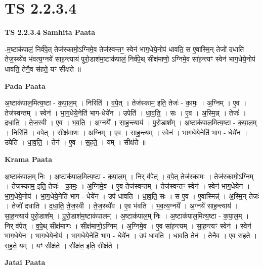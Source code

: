 \documentclass[17pt]{extarticle}
\begin{document}
\section*{ TS 2.2.3.4 }

\textbf{TS 2.2.3.4 } \newline
\textbf{Samhita Paata} \newline

-म॒ष्टाक॑पालं॒ निर्व॑पे॒त् तेज॑स्कामो॒ऽग्निमे॒व तेज॑स्वन्तꣳ॒॒ स्वेन॑ भाग॒धेये॒नोप॑ धावति॒ स ए॒वास्मि॒न् तेजो॑ दधाति तेज॒स्व्ये॑व भ॑वत्य॒ग्नये॑ साह॒न्त्याय॑ पुरो॒डाश॑म॒ष्टाक॑पालं॒ निर्व॑पे॒थ् सीक्ष॑माणो॒ ऽग्निमे॒व सा॑ह॒न्त्यꣳ स्वेन॑ भाग॒धेये॒नोप॑ धावति॒ तेनै॒व स॑हते॒ यꣳ सीक्ष॑ते ॥ \newline

\textbf{Pada Paata} \newline

अ॒ष्टाक॑पाल॒मित्य॒ष्टा - क॒पा॒ल॒म् । निरिति॑ । व॒पे॒त् । तेज॑स्काम॒ इति॒ तेजः॑ - का॒मः॒ । अ॒ग्निम् । ए॒व । तेज॑स्वन्तम् । स्वेन॑ । भा॒ग॒धेये॒नेति॑ भाग-धेये॑न । उपेति॑ । धा॒व॒ति॒ । सः । ए॒व । अ॒स्मि॒न्न् । तेजः॑ । द॒धा॒ति॒ । ते॒ज॒स्वी । ए॒व । भ॒व॒ति॒ । अ॒ग्नये᳚ । सा॒ह॒न्त्याय॑ । पु॒रो॒डाश᳚म् । अ॒ष्टाक॑पाल॒मित्य॒ष्टा - क॒पा॒ल॒म् । निरिति॑ । व॒पे॒त् । सीक्ष॑माणः । अ॒ग्निम् । ए॒व । सा॒ह॒न्त्यम् । स्वेन॑ । भा॒ग॒धेये॒नेति॑ भाग - धेये॑न । उपेति॑ । धा॒व॒ति॒ । तेन॑ । ए॒व । स॒ह॒ते॒ । यम् । सीक्ष॑ते ॥  \newline


\textbf{Krama Paata} \newline

अ॒ष्टाक॑पाल॒म् निः । अ॒ष्टाक॑पाल॒मित्य॒ष्टा - क॒पा॒ल॒म् । निर् व॑पेत् । व॒पे॒त् तेज॑स्कामः । तेज॑स्कामो॒ऽग्निम् । तेज॑स्काम॒ इति॒ तेजः॑ - का॒मः॒ । अ॒ग्निमे॒व । ए॒व तेज॑स्वन्तम् । तेज॑स्वन्तꣳ॒॒ स्वेन॑ । स्वेन॑ भाग॒धेये॑न । भा॒ग॒धेये॒नोप॑ । भा॒ग॒धेये॒नेति॑ भाग - धेये॑न । उप॑ धावति । धा॒व॒ति॒ सः । स ए॒व । ए॒वास्मिन्न्॑ । अ॒स्मि॒न् तेजः॑ । तेजो॑ दधाति । द॒धा॒ति॒ ते॒ज॒स्वी । ते॒ज॒स्व्ये॑व । ए॒व भ॑वति । भ॒व॒त्य॒ग्नये᳚ । अ॒ग्नये॑ साह॒न्त्याय॑ । सा॒ह॒न्त्याय॑ पुरो॒डाश᳚म् । पु॒रो॒डाश॑म॒ष्टाक॑पालम् । अ॒ष्टाक॑पाल॒म् निः । अ॒ष्टाक॑पाल॒मित्य॒ष्टा - क॒पा॒ल॒म् । निर् व॑पेत् । व॒पे॒थ् सीक्ष॑माणः । सीक्ष॑माणो॒ऽग्निम् । अ॒ग्निमे॒व । ए॒व सा॑ह॒न्त्यम् । सा॒ह॒न्त्यꣳ स्वेन॑ । स्वेन॑ भाग॒धेये॑न । भा॒ग॒धेये॒नोप॑ । भा॒ग॒धेये॒नेति॑ भाग - धेये॑न । उप॑ धावति । धा॒व॒ति॒ तेन॑ । तेनै॒व । ए॒व स॑हते । स॒ह॒ते॒ यम् । यꣳ सीक्ष॑ते । सीक्ष॑त॒ इति॒ सीक्ष॑ते । \newline

\textbf{Jatai Paata} \newline
\end{document}

